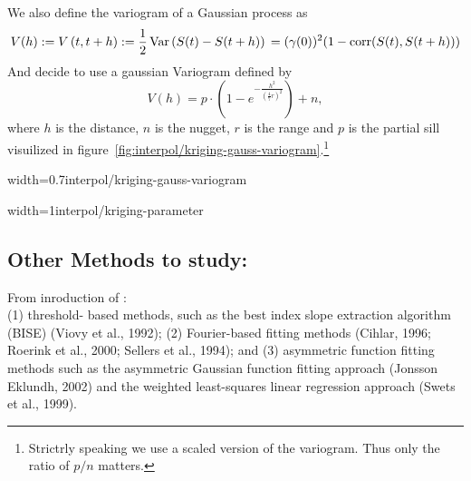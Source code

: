 We also define the variogram of a Gaussian process as
$$V(h):=V\left(t, t+h\right):=\frac{1}{2} \operatorname{Var}\left(S(t)-S(t+h)\right)\\ %
    =(\gamma(0))^2(1-\operatorname{corr}(S(t),S(t+h)))
$$
And decide to use a gaussian Variogram defined by
$$V(h) = p \cdot\left(1-e^{-\frac{h^{2}}{\left(\frac{4}{7} r\right)^{2}}}\right)+n,$$
where $h$ is the distance, $n$ is the nugget, $r$ is the range and $p$ is the partial sill visuilized in figure~\ref{fig:interpol/kriging-gauss-variogram}.\footnote{Strictrly speaking we use a scaled version of the variogram. Thus only the ratio of $p/n$ matters.}
\begin{my_figure}[h]{width=0.7\textwidth}{interpol/kriging-gauss-variogram}
    \caption{Gaussian Variogram with nugget=1, partial sill=3, range=55}
    \label{fig:interpol/kriging-gauss-variogram}
\end{my_figure}

\begin{my_figure}{width=1\textwidth}{interpol/kriging-parameter}
\end{my_figure}


\subsection{Other Methods to study:}
From inroduction of \cite{chenSimpleMethodReconstructing2004a}:\\
(1) threshold-
based methods, such as the best index slope extraction
algorithm (BISE) (Viovy et al., 1992); (2) Fourier-based
fitting methods (Cihlar, 1996; Roerink et al., 2000; Sellers
et al., 1994); and (3) asymmetric function fitting methods
such as the asymmetric Gaussian function fitting approach
(Jonsson Eklundh, 2002) and the weighted least-squares
linear regression approach (Swets et al., 1999).
